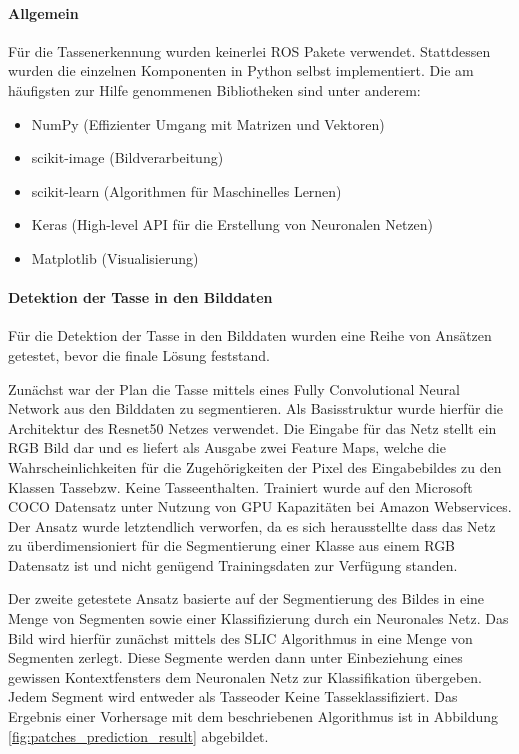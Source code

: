 \paragraph{Allgemein}
Für die Tassenerkennung wurden keinerlei ROS Pakete verwendet. Stattdessen wurden die einzelnen Komponenten in Python selbst implementiert. Die am häufigsten zur Hilfe genommenen Bibliotheken sind unter anderem:
\begin{itemize}
\item NumPy (Effizienter Umgang mit Matrizen und Vektoren)
\item scikit-image (Bildverarbeitung)
\item scikit-learn (Algorithmen für Maschinelles Lernen)
\item Keras (High-level API für die Erstellung von Neuronalen Netzen)
\item Matplotlib (Visualisierung)
\end{itemize}

\paragraph{Detektion der Tasse in den Bilddaten}
Für die Detektion der Tasse in den Bilddaten wurden eine Reihe von Ansätzen getestet, bevor die finale Lösung feststand.

Zunächst war der Plan die Tasse mittels eines Fully Convolutional Neural Network aus den Bilddaten zu segmentieren. Als Basisstruktur wurde hierfür die Architektur des Resnet50 Netzes verwendet. Die Eingabe für das Netz stellt ein RGB Bild dar und es liefert als Ausgabe zwei Feature Maps, welche die Wahrscheinlichkeiten für die Zugehörigkeiten der Pixel des Eingabebildes zu den Klassen \glqq Tasse\grqq bzw. \glqq Keine Tasse\grqq enthalten. Trainiert wurde auf den Microsoft COCO Datensatz unter Nutzung von GPU Kapazitäten bei Amazon Webservices. Der Ansatz wurde letztendlich verworfen, da es sich herausstellte dass das Netz zu überdimensioniert für die Segmentierung einer Klasse aus einem RGB Datensatz ist und nicht genügend Trainingsdaten zur Verfügung standen.

Der zweite getestete Ansatz basierte auf der Segmentierung des Bildes in eine Menge von Segmenten sowie einer Klassifizierung durch ein Neuronales Netz. Das Bild wird hierfür zunächst mittels des SLIC Algorithmus in eine Menge von Segmenten zerlegt. Diese Segmente werden dann unter Einbeziehung eines gewissen Kontextfensters dem Neuronalen Netz zur Klassifikation übergeben. Jedem Segment wird entweder als \glqq Tasse\grqq oder \glqq Keine Tasse\grqq klassifiziert. Das Ergebnis einer Vorhersage mit dem beschriebenen Algorithmus ist in Abbildung \ref{fig:patches_prediction_result} abgebildet.

